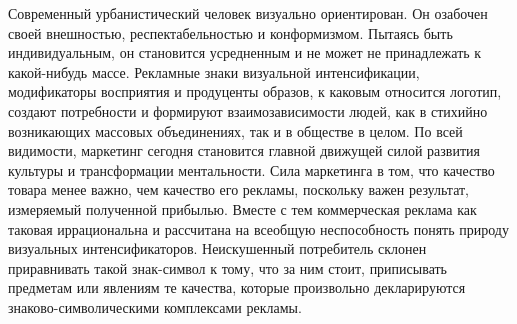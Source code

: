 Современный урбанистический человек визуально ориентирован. Он озабочен своей внешностью, респектабельностью и конформизмом.  Пытаясь быть индивидуальным, он становится усредненным и не может не принадлежать к какой-нибудь массе. Рекламные знаки визуальной интенсификации, модификаторы восприятия и продуценты образов, к каковым относится логотип,  создают потребности и формируют взаимозависимости людей, как в стихийно возникающих массовых объединениях, так и в обществе в целом. 
По всей видимости, маркетинг сегодня становится главной движущей силой развития культуры и трансформации ментальности. Сила маркетинга в том, что качество товара менее важно, чем качество его рекламы, поскольку важен результат, измеряемый полученной прибылью. Вместе с тем коммерческая реклама как таковая иррациональна и рассчитана на всеобщую неспособность понять  природу визуальных интенсификаторов. Неискушенный потребитель склонен приравнивать такой знак-символ к тому, что за ним стоит, приписывать предметам или явлениям те качества, которые произвольно декларируются знаково-символическими комплексами рекламы.   

